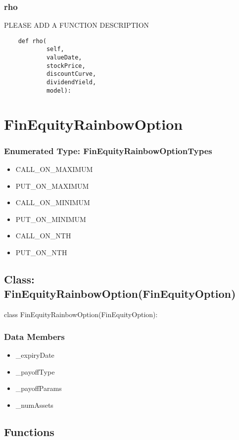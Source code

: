 \documentclass[twoside,11pt]{book}
\begin{document}
\subsubsection*{{\bf rho}}
PLEASE ADD A FUNCTION DESCRIPTION

\begin{lstlisting}
    def rho(
            self,
            valueDate,
            stockPrice,
            discountCurve,
            dividendYield,
            model):
\end{lstlisting}

\newpage
\section{FinEquityRainbowOption}

\subsubsection{Enumerated Type: FinEquityRainbowOptionTypes}
\begin{itemize}
\item{CALL\_ON\_MAXIMUM}
\item{PUT\_ON\_MAXIMUM}
\item{CALL\_ON\_MINIMUM}
\item{PUT\_ON\_MINIMUM}
\item{CALL\_ON\_NTH}
\item{PUT\_ON\_NTH}
\end{itemize}

\subsection*{Class: FinEquityRainbowOption(FinEquityOption)}
class FinEquityRainbowOption(FinEquityOption): 

\subsubsection*{Data Members}
\begin{itemize}
\item{\_expiryDate}
\item{\_payoffType}
\item{\_payoffParams}
\item{\_numAssets}
\end{itemize}

\subsection*{Functions}
\end{document}
